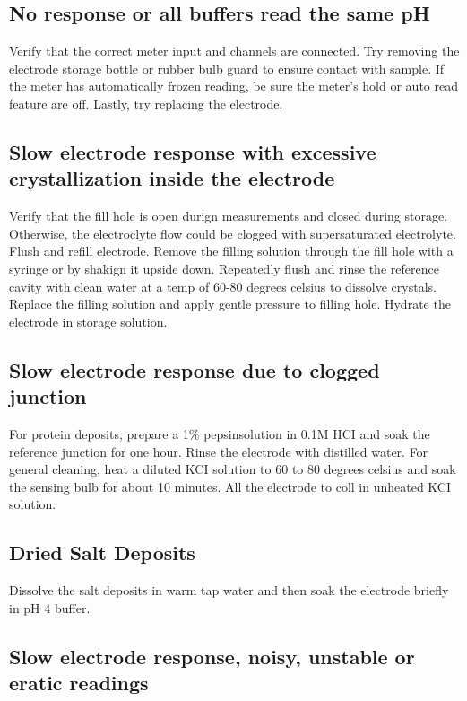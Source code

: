 \documentclass[12pt]{../SOP3}\usepackage[]{graphicx}\usepackage[]{xcolor}
\begin{document}
\subsection{No response or all buffers read the same pH}

\NP Verify that the correct meter input and channels are connected. Try removing the electrode storage bottle or rubber bulb guard to ensure contact with sample. If the meter has automatically frozen reading, be sure the meter's hold or auto read feature are off. Lastly, try replacing the electrode.  

\subsection{Slow electrode response with excessive crystallization inside the electrode}

\NP Verify that the fill hole is open durign measurements and closed during storage. Otherwise, the electroclyte flow could be clogged with supersaturated electrolyte. Flush and refill electrode. Remove the filling solution through the fill hole with a syringe or by shakign it upside down. Repeatedly flush and rinse the reference cavity with clean water at a temp of 60-80 degrees celsius to dissolve crystals. Replace the filling solution and apply gentle pressure to filling hole. Hydrate the electrode in storage solution.

\subsection{Slow electrode response due to clogged junction}

\NP For protein deposits, prepare a 1\% pepsinsolution in 0.1M HCI and soak the reference junction for one hour. Rinse the electrode with distilled water. For general cleaning, heat a diluted KCI solution to 60 to 80 degrees celsius and soak the sensing bulb for about 10 minutes. All the electrode to coll in unheated KCI solution.

\subsection{Dried Salt Deposits}

\NP Dissolve the salt deposits in warm tap water and then soak the electrode briefly in pH 4 buffer.

\subsection{Slow electrode response, noisy, unstable or eratic readings}
\end{document}
